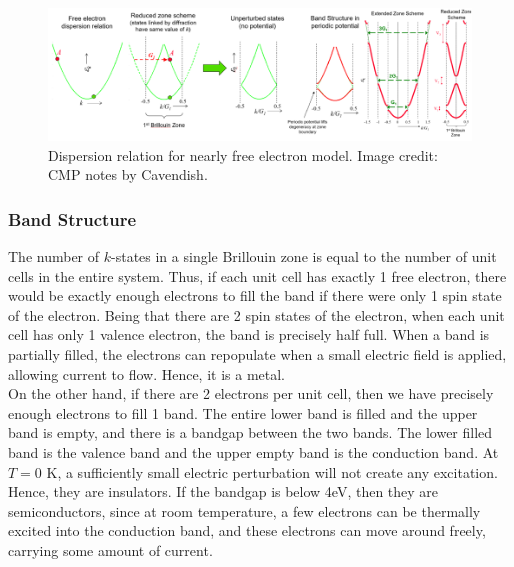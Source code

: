 \documentclass[a4paper]{article}
\begin{document}
\begin{figure}[H]
    \centering
    \includegraphics[width=\linewidth]{nfem.PNG}
    \caption{Dispersion relation for nearly free electron model. Image credit: CMP notes by Cavendish.}
\end{figure}
\newpage
\subsubsection*{Band Structure~\cite{ashcroft1976solid,simon2013oxford,singleton2001band}}
\begin{Note}
The number of $k$-states in a single Brillouin zone is equal to the number of unit cells in the entire system. Thus, if each unit cell has exactly 1 free electron, there would be exactly enough electrons to fill the band if there were only 1 spin state of the electron. Being that there are 2 spin states of the electron, when each unit cell has only 1 valence electron, the band is precisely half full. When a band is partially filled, the electrons can repopulate when a small electric field is applied, allowing current to flow. Hence, it is a metal.\\[5pt]
On the other hand, if there are 2 electrons per unit cell, then we have precisely enough electrons to fill 1 band. The entire lower band is filled and the upper band is empty, and there is a bandgap between the two bands. The lower filled band is the valence band and the upper empty band is the conduction band. At $T=0$ K, a sufficiently small electric perturbation will not create any excitation. Hence, they are insulators. If the bandgap is below 4eV, then they are semiconductors, since at room temperature, a few electrons can be thermally excited into the conduction band, and these electrons can move around freely, carrying some amount of current.
\end{Note}
\end{document}
